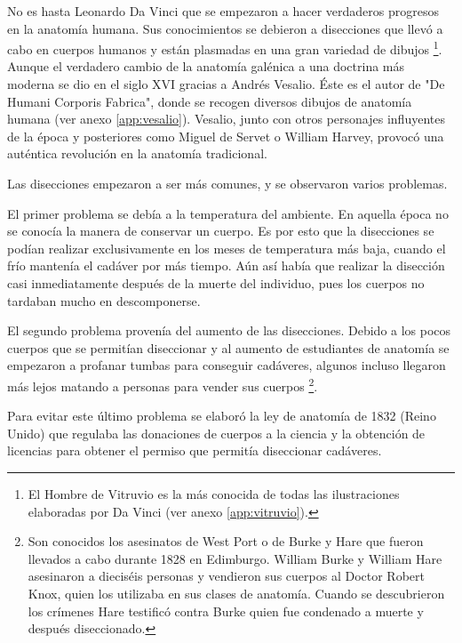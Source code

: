 No es hasta Leonardo Da Vinci que se empezaron a hacer verdaderos progresos en la anatomía humana. Sus conocimientos se debieron a disecciones que llevó a cabo en cuerpos humanos y están plasmadas en una gran variedad de dibujos \footnote{El Hombre de Vitruvio es la más conocida de todas las ilustraciones elaboradas por Da Vinci (ver anexo \autoref{app:vitruvio}).}. Aunque el verdadero cambio de la anatomía galénica a una doctrina más moderna se dio en el siglo XVI gracias a Andrés Vesalio. Éste es el autor de "De Humani Corporis Fabrica", donde se recogen diversos dibujos de anatomía humana (ver anexo \autoref{app:vesalio}). Vesalio, junto con otros personajes influyentes de la época y posteriores como Miguel de Servet o William Harvey, provocó una auténtica revolución en la anatomía tradicional.


Las disecciones empezaron a ser más comunes, y se observaron varios problemas.

El primer problema se debía a la temperatura del ambiente. En aquella época no se conocía la manera de conservar un cuerpo. Es por esto que la disecciones se podían realizar exclusivamente en los meses de temperatura más baja, cuando el frío mantenía el cadáver por más tiempo. Aún así había que realizar la disección casi inmediatamente después de la muerte del individuo, pues los cuerpos no tardaban mucho en descomponerse.

El segundo problema provenía del aumento de las disecciones. Debido a los pocos cuerpos que  se permitían diseccionar y al aumento de estudiantes de anatomía se empezaron a profanar tumbas para conseguir cadáveres, algunos incluso llegaron más lejos matando a personas para vender sus cuerpos \footnote{Son conocidos los asesinatos de West Port o de Burke y Hare que fueron llevados a cabo durante 1828 en Edimburgo. William Burke y William Hare asesinaron a dieciséis personas y vendieron sus cuerpos al Doctor Robert Knox, quien los utilizaba en sus clases de anatomía. Cuando se descubrieron los crímenes Hare testificó contra Burke quien fue condenado a muerte y después diseccionado.}.

Para evitar este último problema se elaboró la ley de anatomía de 1832 (Reino Unido) que regulaba las donaciones de cuerpos a la ciencia y la obtención de licencias para obtener el permiso que permitía diseccionar cadáveres.

